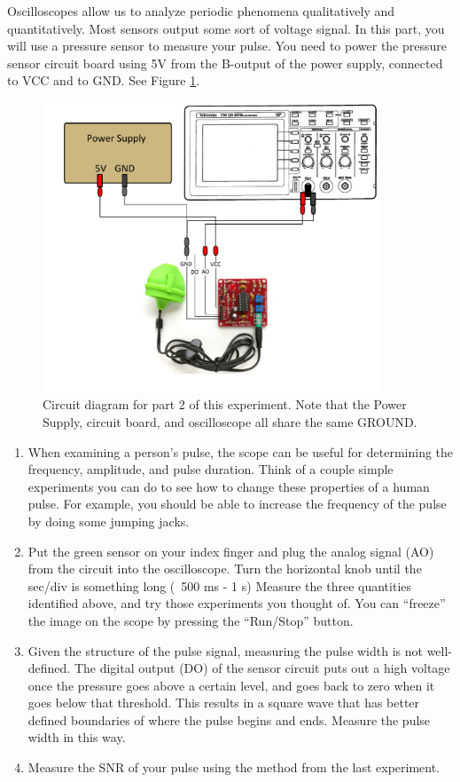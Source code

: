 Oscilloscopes allow us to analyze periodic phenomena qualitatively and quantitatively. Most sensors output some sort of voltage signal. In this part, you will use a pressure sensor to measure your pulse. You need to power the pressure sensor circuit board using 5V from the B-output of the power supply, connected to VCC and to GND. See Figure \ref{fig:part2}.

\begin{figure}[h!]
        \centering
            \includegraphics[width=0.9\textwidth]{./Exp1-10/pic/part2.pdf}
        \caption{Circuit diagram for part 2 of this experiment. Note that the Power Supply, circuit board, and oscilloscope all share the same GROUND.}
        \label{fig:part2}
\end{figure}

\begin{enumerate}
\item When examining a person's pulse, the scope can be useful for determining the frequency, amplitude, and pulse duration. Think of a couple simple experiments you can do to see how to change these properties of a human pulse. For example, you should be able to increase the frequency of the pulse by doing some jumping jacks.

\item Put the green sensor on your index finger and plug the analog signal (AO) from the circuit into the oscilloscope. Turn the horizontal knob until the sec/div is something long (~500 ms - 1 s) Measure the three quantities identified above, and try those experiments you thought of. You can ``freeze'' the image on the scope by pressing the ``Run/Stop'' button.

\item Given the structure of the pulse signal, measuring the pulse width is not well-defined. The digital output (DO) of the sensor circuit puts out a high voltage once the pressure goes above a certain level, and goes back to zero when it goes below that threshold. This results in a square wave that has better defined boundaries of where the pulse begins and ends. Measure the pulse width in this way.

\item Measure the SNR of your pulse using the method from the last experiment.
\end{enumerate}

